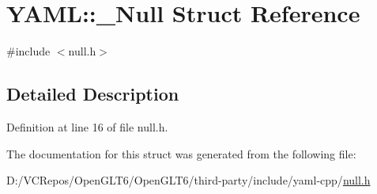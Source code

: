 \hypertarget{struct_y_a_m_l_1_1___null}{}\section{Y\+A\+ML\+::\+\_\+\+Null Struct Reference}
\label{struct_y_a_m_l_1_1___null}


{\ttfamily \#include $<$null.\+h$>$}



\subsection{Detailed Description}


Definition at line 16 of file null.\+h.



The documentation for this struct was generated from the following file\+:\begin{DoxyCompactItemize}
\item 
D\+:/\+V\+C\+Repos/\+Open\+G\+L\+T6/\+Open\+G\+L\+T6/third-\/party/include/yaml-\/cpp/\mbox{\hyperlink{null_8h}{null.\+h}}\end{DoxyCompactItemize}
